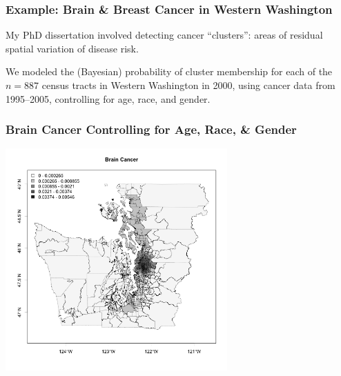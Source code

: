 \documentclass[handout]{beamer}
\begin{document}
\begin{frame}[fragile]
\frametitle{Example: Brain \& Breast Cancer in Western Washington}

My PhD dissertation involved detecting cancer ``clusters'': areas of residual spatial variation of disease risk.

\vspace{1cm}

We modeled the (Bayesian) probability of cluster membership for each of the $n=887$ census tracts in Western Washington in 2000, using cancer data from 1995--2005, controlling for age, race, and gender.  




\end{frame}


\begin{frame}[fragile]
\frametitle{Brain Cancer Controlling for Age, Race, \& Gender}
\begin{center}
\includegraphics[width=8.5cm]{figure/brain.png}
\end{center}
\end{frame}
\end{document}
